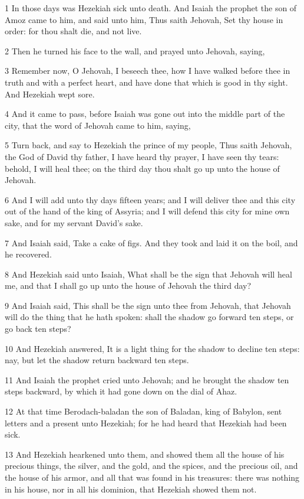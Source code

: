 \par 1 In those days was Hezekiah sick unto death. And Isaiah the prophet the son of Amoz came to him, and said unto him, Thus saith Jehovah, Set thy house in order: for thou shalt die, and not live.
\par 2 Then he turned his face to the wall, and prayed unto Jehovah, saying,
\par 3 Remember now, O Jehovah, I beseech thee, how I have walked before thee in truth and with a perfect heart, and have done that which is good in thy sight. And Hezekiah wept sore.
\par 4 And it came to pass, before Isaiah was gone out into the middle part of the city, that the word of Jehovah came to him, saying,
\par 5 Turn back, and say to Hezekiah the prince of my people, Thus saith Jehovah, the God of David thy father, I have heard thy prayer, I have seen thy tears: behold, I will heal thee; on the third day thou shalt go up unto the house of Jehovah.
\par 6 And I will add unto thy days fifteen years; and I will deliver thee and this city out of the hand of the king of Assyria; and I will defend this city for mine own sake, and for my servant David's sake.
\par 7 And Isaiah said, Take a cake of figs. And they took and laid it on the boil, and he recovered.
\par 8 And Hezekiah said unto Isaiah, What shall be the sign that Jehovah will heal me, and that I shall go up unto the house of Jehovah the third day?
\par 9 And Isaiah said, This shall be the sign unto thee from Jehovah, that Jehovah will do the thing that he hath spoken: shall the shadow go forward ten steps, or go back ten steps?
\par 10 And Hezekiah answered, It is a light thing for the shadow to decline ten steps: nay, but let the shadow return backward ten steps.
\par 11 And Isaiah the prophet cried unto Jehovah; and he brought the shadow ten steps backward, by which it had gone down on the dial of Ahaz.
\par 12 At that time Berodach-baladan the son of Baladan, king of Babylon, sent letters and a present unto Hezekiah; for he had heard that Hezekiah had been sick.
\par 13 And Hezekiah hearkened unto them, and showed them all the house of his precious things, the silver, and the gold, and the spices, and the precious oil, and the house of his armor, and all that was found in his treasures: there was nothing in his house, nor in all his dominion, that Hezekiah showed them not.

